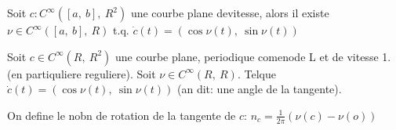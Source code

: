\begin{lemme}
	Soit $c:C^\infty([a,\ b],\ R^2)$ une courbe plane devitesse, alors il existe $\nu\in C^\infty([a,\ b],\ R)$ t.q. $\dot{c}(t)=(\cos\nu(t),\ \sin\nu(t))$
\end{lemme}

\begin{definition}
	Soit $c\in C^\infty(R,\ R^2)$ une courbe plane, periodique comenode L et de vitesse 1. (en partiquliere reguliere). Soit $\nu\in C^\infty(R,\ R)$.
	Telque $\dot{c}(t)=(\cos \nu (t),\ \sin\nu(t))$ (an dit: une angle de la tangente).
	
	On define le nobn de rotation de la tangente de $c$: $n_c=\frac{1}{2\pi}(\nu(c)-\nu(o))$
\end{definition}

